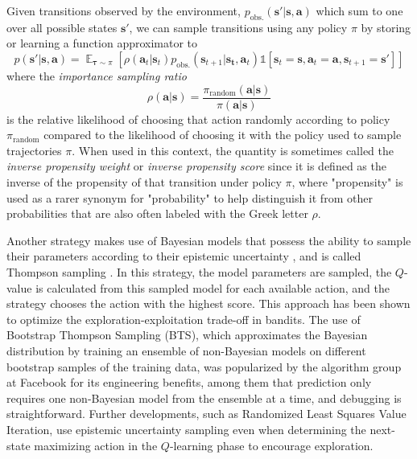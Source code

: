\documentclass{article}
\begin{document}
Given transitions observed by the environment, $p_\text{obs.}(\mathbf{s}'|\mathbf{s},\mathbf{a})$ which sum to one over all possible states $\mathbf{s}'$, we can sample transitions using any policy $\pi$ by storing or learning a function approximator to \begin{equation}p(\mathbf{s}'|\mathbf{s},\mathbf{a})=\mathop{\mathbb{E}}_{\boldsymbol{\tau}\sim\pi}\left[\rho(\mathbf{a}_t|\mathbf{s}_t)p_\text{obs.}(\mathbf{s}_{t+1}|\mathbf{s_t},\mathbf{a}_t)\mathbb{1}\left[\mathbf{s}_t=\mathbf{s},\mathbf{a}_t=\mathbf{a},\mathbf{s}_{t+1}=\mathbf{s}'\right]\right]\end{equation}where the \textit{importance sampling ratio}
\begin{equation}\rho(\mathbf{a}|\mathbf{s})=\frac{\pi_\text{random}(\mathbf{a}|\mathbf{s})}{\pi(\mathbf{a}|\mathbf{s})}\end{equation}is the relative likelihood of choosing that action randomly according to policy $\pi_\text{random}$ compared to the likelihood of choosing it with the policy used to sample trajectories $\pi$. When used in this context, the quantity is sometimes called the \textit{inverse propensity weight} or \textit{inverse propensity score} since it is defined as the inverse of the propensity of that transition under policy $\pi$, where "propensity" is used as a rarer synonym for "probability" to help distinguish it from other probabilities that are also often labeled with the Greek letter $\rho$.

Another strategy makes use of Bayesian models that possess the ability to sample their parameters according to their epistemic uncertainty \cite{GP_BLR}, and is called Thompson sampling \cite{thompson_sampling}. In this strategy, the model parameters are sampled, the $Q$-value is calculated from this sampled model for each available action, and the strategy chooses the action with the highest score. This approach has been shown to optimize the exploration-exploitation trade-off in bandits\cite{thompson_sampling,bootstrap_DQN}. The use of Bootstrap Thompson Sampling (BTS), which approximates the Bayesian distribution by training an ensemble of non-Bayesian models on different bootstrap samples of the training data, was popularized by the algorithm group at Facebook for its engineering benefits, among them that prediction only requires one non-Bayesian model from the ensemble at a time, and debugging is straightforward\cite{bootstrap_facebook}. Further developments, such as Randomized Least Squares Value Iteration, use epistemic uncertainty sampling even when determining the next-state maximizing action in the $Q$-learning phase\cite{RLSVI} to encourage exploration.
\end{document}
